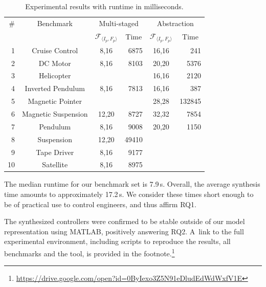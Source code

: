 \documentclass[runningheads,a4paper]{llncs}
\newcommand{\xmark}{\ding{55}}
\begin{document}
\begin{table}
\centering
\scriptsize
\begin{tabular}{| r | c | c | r | c | r |}
\hline
\# & Benchmark  & \multicolumn{2}{|c|}{Multi-staged}                 & \multicolumn{2}{|c|}{Abstraction} \\
   &            & \multicolumn{1}{|c|}{$\mathcal{F}_{\langle I_p,F_p \rangle}$} & \multicolumn{1}{|c|}{Time} & \multicolumn{1}{|c|}{$\mathcal{F}_{\langle I_p,F_p \rangle}$} & \multicolumn{1}{|c|}{Time} \\\hline
1  & Cruise Control      & 8,16   & 6875   & 16,16  & 241    \\
2  & DC Motor            & 8,16   & 8103   & 20,20  & 5376   \\
3  & Helicopter          & \xmark & \xmark & 16,16  & 2120   \\
4  & Inverted Pendulum   & 8,16   & 7813   & 16,16  & 387    \\
5  & Magnetic Pointer    & \xmark & \xmark & 28,28  & 132845 \\
6  & Magnetic Suspension & 12,20  & 8727   & 32,32  & 7854   \\
7  & Pendulum            & 8,16   & 9008   & 20,20  & 1150   \\
8  & Suspension          & 12,20  & 49410  & \xmark & \xmark \\
9  & Tape Driver         & 8,16   & 9177   & \xmark & \xmark \\
10 & Satellite           & 8,16   & 8975   & \xmark & \xmark \\\hline

\end{tabular}
\caption{Experimental results with runtime in milliseconds. \label{tab:results}}
\end{table}

The median runtime for our benchmark set is 7.9\,s.  Overall,
the average synthesis time amounts to approximately 17.2\,s.  We
consider these times short enough to be of practical use to control
engineers, and thus affirm RQ1.  

The
synthesized controllers were confirmed to be stable outside of our model
representation using MATLAB, positively answering RQ2.  A~link to the full
experimental environment, including scripts to reproduce the results, all
benchmarks and the tool, is provided in the
footnote.\footnote{\url{https://drive.google.com/open?id=0ByIexo3Z5N91eDludEdWdWxfV1E}}


\end{document}
